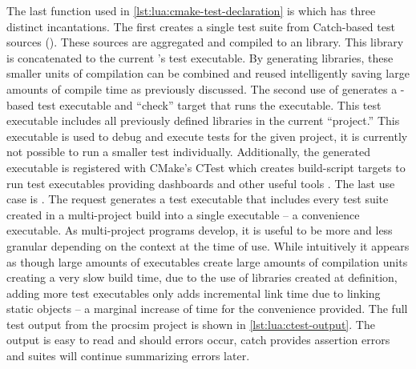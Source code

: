 The last function used in \cref{lst:lua:cmake-test-declaration} is  which has three distinct incantations. The first creates a single test suite from Catch-based test sources (\cite{CatchLib}). These sources are aggregated and compiled to an  library. This library is concatenated to the current 's test executable. By generating  libraries, these smaller units of compilation can be combined and reused intelligently saving large amounts of compile time as previously discussed. The second use of  generates a -based test executable and ``check'' target that runs the executable. This test executable includes all previously defined  libraries in the current ``project.'' This executable is used to debug and execute tests for the given project, it is currently not possible to run a smaller test individually. Additionally, the generated executable is registered with CMake's CTest which creates build-script targets to run test executables providing dashboards and other useful tools \cite{CMake:CTest}. The last use case is . The  request generates a test executable that includes every test suite created in a multi-project build into a single executable -- a convenience executable. As multi-project programs develop, it is useful to be more and less granular depending on the context at the time of use. While intuitively it appears as though large amounts of executables create large amounts of compilation units creating a very slow build time, due to the use of  libraries created at definition, adding more test executables only adds incremental link time due to linking static objects -- a marginal increase of time for the convenience provided. The full test output from the procsim project is shown in \cref{lst:lua:ctest-output}. The output is easy to read and should errors occur, catch provides assertion errors and suites will continue summarizing errors later.

